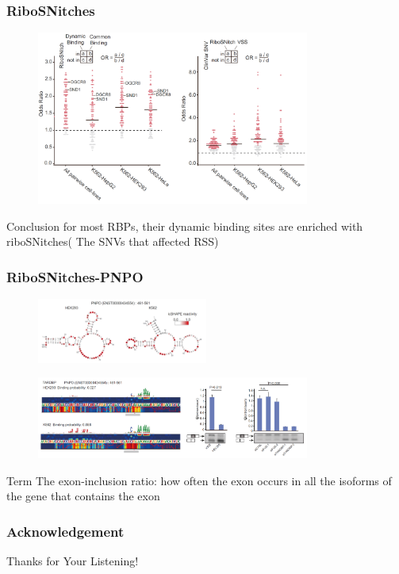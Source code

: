 \documentclass{ctexbeamer}
\begin{document}
\begin{frame}
  \frametitle{RiboSNitches}
  \begin{figure}[H]
    \center
    \includegraphics[width=0.8\textwidth]{./figures/ribosnitch1.png}
    \label{fig:rn1}
  \end{figure}
    \begin{block}{Conclusion}
    for most RBPs, their dynamic binding sites are enriched with riboSNitches( The SNVs that affected RSS)
  \end{block}
\end{frame}

\begin{frame}
  \frametitle{RiboSNitches-PNPO}
  \begin{figure}[H]
    \includegraphics[width=0.5\textwidth]{./figures/PNPO1.png}
    \label{fig:rn1}
  \end{figure}
  \begin{figure}[H]
  \includegraphics[width=0.8\textwidth]{./figures/pnpo2.png}
  \label{fig:rn1}
  \end{figure}
    \begin{block}{Term}
    The exon-inclusion ratio: how often the exon occurs in all the isoforms of the gene that contains the exon
  \end{block}
\end{frame}

\begin{frame}
  \frametitle{Acknowledgement}
  \centerline{\Large Thanks for Your Listening!}
\end{frame}
\end{document}
